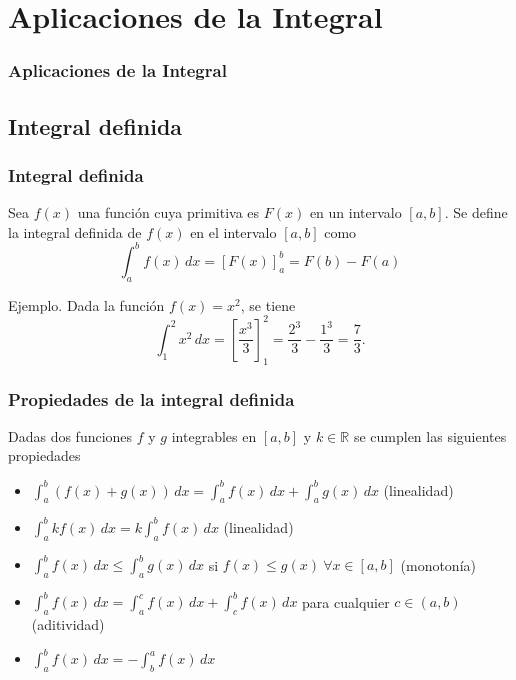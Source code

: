 

\section{Aplicaciones de la Integral}
\begin{frame}
\frametitle{Aplicaciones de la Integral}
\tableofcontents[sectionstyle=show/hide,hideothersubsections]
\end{frame}



\subsection{Integral definida}
\begin{frame}
\frametitle{Integral definida}
\begin{definicion}
Sea $f(x)$ una función cuya primitiva es $F(x)$ en un intervalo $[a,b]$. Se define la integral definida de $f(x)$ en el intervalo $[a,b]$ como
\[
\int_a^b f(x)\,dx = \left[F(x)\right]_a^b=F(b)-F(a)
\]
\end{definicion}
Ejemplo. Dada la función $f(x)=x^2$, se tiene
\[
\int_1^2 x^2\,dx = \left[\frac{x^3}{3}\right]_1^2 = \frac{2^3}{3}-\frac{1^3}{3} = \frac{7}{3}.
\]
\end{frame}


\begin{frame}
\frametitle{Propiedades de la integral definida}
Dadas dos funciones $f$ y $g$ integrables en $[a,b]$ y $k \in \mathbb{R}$ se cumplen las siguientes propiedades
\begin{itemize}
\item $\int_{a}^{b}(f(x)+g(x))\,dx=\int_{a}^{b}f(x)\,dx+\int_{a}^{b}g(x)\,dx$ (linealidad)
\item $\int_{a}^{b}{kf(x)}\,dx=k\int_{a}^{b}{f(x)}\,dx$ (linealidad)
\item $\int_{a}^{b}{f(x)\,dx} \leq \int_{a}^{b}{g(x)\,dx}$ si $f(x)\leq g(x)\ \forall x \in [a,b]$ (monotonía)
\item $\int_{a}^{b}{f(x)\,dx} = \int_{a}^{c}{f(x)\,dx}+\int_{c}^{b}{f(x)\,dx}$ para cualquier $c\in(a,b)$ (aditividad)
\item $\int_a^b f(x)\,dx = -\int_b^a f(x)\,dx$
\end{itemize}
\end{frame}



